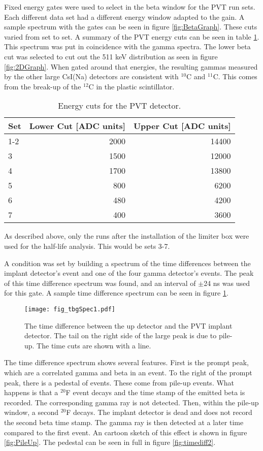 \documentclass[MaxHughesThesis.tex]{subfiles}
\begin{document}
Fixed energy gates were used to select in the beta window for the PVT run sets.
Each different data set had a different energy window adapted to the gain.
A sample spectrum with the gates can be seen in figure \ref{fig:BetaGraph}.
These cuts varied from set to set.
A summary of the PVT energy cuts can be seen in table \ref{tab:PVTCuts}.
This spectrum was put in coincidence with the gamma spectra. 
The lower beta cut was selected to cut out the 511 keV distribution as seen in figure \ref{fig:2DGraph}.
When gated around that energies, the resulting gammas measured by the other large CsI(Na) detectors are consistent with $^{10}$C and $^{11}$C.
This comes from the break-up of the $^{12}$C in the plastic scintillator. 

\begin{table}[!htb]
	\centering
	\caption{Energy cuts for the PVT detector.}
	\begin{tabular}{lrr}
	Set & Lower Cut [ADC units] & Upper Cut [ADC units] \\ \hline
	1-2 & 2000 & 14400 \\
	3 & 1500 & 12000\\
	4 & 1700 & 13800 \\
	5 & 800 & 6200 \\
	6 & 480 & 4200 \\
	7 & 400 & 3600
	\end{tabular}
	\label{tab:PVTCuts}
\end{table}
As described above, only the runs after the installation of the limiter box were used for the half-life analysis. 
This would be sets 3-7.

A condition was set by building a spectrum of the time differences between the implant detector's event and one of the four gamma detector's events. 
The peak of this time difference spectrum was found, and an interval of $\pm$24 ns was used for this gate.
A sample time difference spectrum can be seen in figure \ref{fig:timediff}.

\begin{figure}
	\centerline{\texttt{[image: fig\_tbgSpec1.pdf]}}	
	\caption{The time difference between the up detector and the PVT implant detector.
		The tail on the right side of the large peak is due to pile-up.
		The time cuts are shown with a line.}
	\label{fig:timediff}
\end{figure}

The time difference spectrum shows several features.
First is the prompt peak, which are a correlated gamma and beta in an event. 
To the right of the prompt peak, there is a pedestal of events.
These come from pile-up events.
What happens is that a $^{20}$F event decays and the time stamp of the emitted beta is recorded.
The corresponding gamma ray is not detected.
Then, within the pile-up window, a second $^{20}$F decays.  
The implant detector is dead and does not record the second beta time stamp.
The gamma ray is then detected at a later time compared to the first event.
An cartoon sketch of this effect is shown in figure \ref{fig:PileUp}.
The pedestal can be seen in full in figure \ref{fig:timediff2}.
\end{document}
